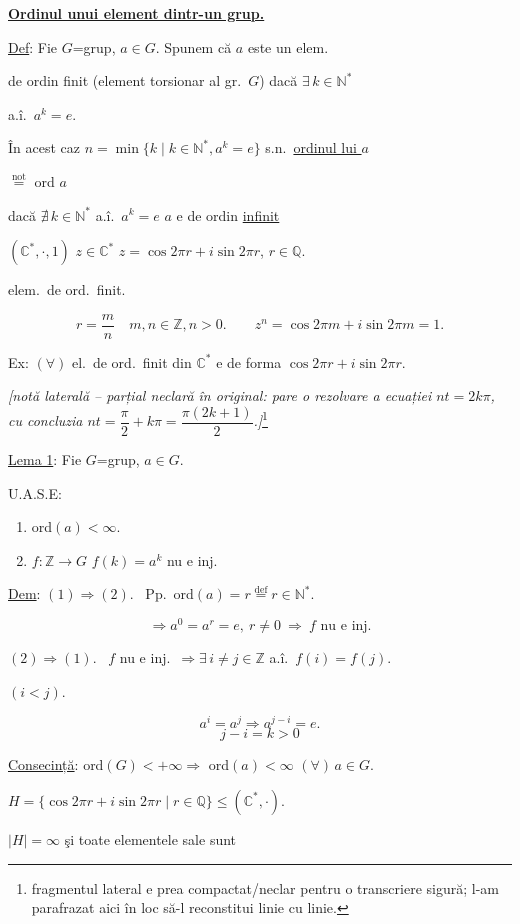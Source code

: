 \documentclass[12pt]{article}
\begin{document}
\noindent\underline{\textbf{Ordinul unui element dintr-un grup.}}

\bigskip
\noindent\underline{Def}: Fie $G$=grup, $a\in G$. Spunem că $a$ este un elem.

\noindent de ordin finit (element torsionar al gr.\ $G$) dacă $\exists\, k\in\mathbb{N}^*$

\noindent a.î.\ $a^k=e$.

\bigskip
\noindent În acest caz $n=\min\{k \mid k\in\mathbb{N}^*, a^k=e\}$ s.n.\ \underline{ordinul lui $a$}

\noindent $\overset{\text{not}}{=}$ ord $a$

\bigskip
\noindent dacă $\nexists\, k\in\mathbb{N}^*$ a.î.\ $a^k=e$ \quad $a$ e de ordin \underline{infinit}

\bigskip
\noindent $(\mathbb{C}^*,\cdot,1)$ \quad $z\in\mathbb{C}^*$ \quad $z=\cos 2\pi r + i\sin 2\pi r$, $r\in\mathbb{Q}$.

\noindent elem.\ de ord.\ finit.

\[
r=\frac{m}{n} \quad m,n\in\mathbb{Z}, n>0. \qquad z^n = \cos 2\pi m + i\sin 2\pi m = 1.
\]

\noindent Ex: $(\forall)$ el.\ de ord.\ finit din $\mathbb{C}^*$ e de forma $\cos 2\pi r+i\sin 2\pi r$.

\bigskip
\noindent \textit{[notă laterală -- parțial neclară în original: pare o rezolvare a ecuației $nt=2k\pi$, cu concluzia $nt=\dfrac{\pi}{2}+k\pi=\dfrac{\pi(2k+1)}{2}$.]}\footnote{fragmentul lateral e prea compactat/neclar pentru o transcriere sigură; l-am parafrazat aici în loc să-l reconstitui linie cu linie.}

\bigskip
\noindent\underline{Lema 1}: Fie $G$=grup, $a\in G$.

\noindent U.A.S.E:

\begin{enumerate}
\item[(1)] ord$(a)<\infty$.
\item[(2)] $f:\mathbb{Z}\to G$ \quad $f(k)=a^k$ nu e inj.
\end{enumerate}

\bigskip
\noindent\underline{Dem}: $(1)\Rightarrow(2)$. \ Pp.\ ord$(a)=r \overset{\text{def}}{=} r\in\mathbb{N}^*$.

\[
\Rightarrow a^0=a^r=e, \ r\neq 0 \ \Rightarrow \ f \text{ nu e inj.}
\]

\bigskip
\noindent $(2)\Rightarrow(1)$. \ $f$ nu e inj.\ $\Rightarrow \exists\, i\neq j\in\mathbb{Z}$ a.î.\ $f(i)=f(j)$.

\noindent $(i<j)$.

\[
a^i=a^j \Rightarrow a^{j-i}=e.
\]
\[
j-i=k>0
\]

\bigskip
\noindent\underline{Consecință}: ord$(G)<+\infty \Rightarrow$ ord$(a)<\infty$ $(\forall)\,a\in G$.

\bigskip
\noindent $H=\{\cos 2\pi r+i\sin 2\pi r \mid r\in\mathbb{Q}\} \leq (\mathbb{C}^*,\cdot)$.

\noindent $|H|=\infty$ şi toate elementele sale sunt
\end{document}
